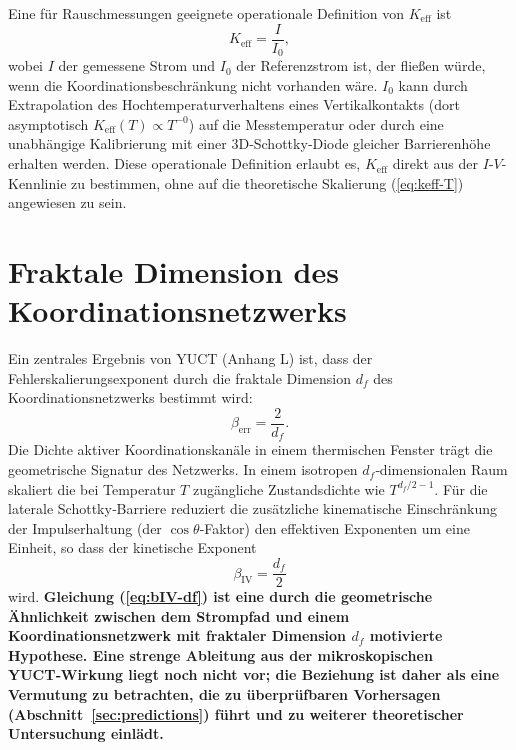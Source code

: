 \documentclass[12pt,a4paper]{article}
\newcommand{\Keff}{K_{\mathrm{eff}}}
\begin{document}
	Eine für Rauschmessungen geeignete operationale Definition von $\Keff$ ist
	\begin{equation}
		\Keff = \frac{I}{I_0},
		\label{eq:keff-operational}
	\end{equation}
	wobei $I$ der gemessene Strom und $I_0$ der Referenzstrom ist, der fließen
	würde, wenn die Koordinationsbeschränkung nicht vorhanden wäre. $I_0$ kann
	durch Extrapolation des Hochtemperaturverhaltens eines Vertikalkontakts
	(dort asymptotisch $\Keff(T) \propto T^{-0}$) auf die Messtemperatur oder
	durch eine unabhängige Kalibrierung mit einer 3D‑Schottky‑Diode gleicher
	Barrierenhöhe erhalten werden. Diese operationale Definition erlaubt es,
	$\Keff$ direkt aus der $I$‑$V$-Kennlinie zu bestimmen, ohne auf die
	theoretische Skalierung (\ref{eq:keff-T}) angewiesen zu sein.
	
	\section{Fraktale Dimension des Koordinationsnetzwerks}
	
	Ein zentrales Ergebnis von YUCT (Anhang L) ist, dass der
	Fehlerskalierungsexponent durch die fraktale Dimension $d_f$ des
	Koordinationsnetzwerks bestimmt wird:
	\begin{equation}
		\beta_{\mathrm{err}} = \frac{2}{d_f}.
		\label{eq:beta-df}
	\end{equation}
	Die Dichte aktiver Koordinationskanäle in einem thermischen Fenster trägt
	die geometrische Signatur des Netzwerks. In einem isotropen $d_f$‑dimensionalen
	Raum skaliert die bei Temperatur $T$ zugängliche Zustandsdichte wie
	$T^{d_f/2 - 1}$. Für die laterale Schottky‑Barriere reduziert die zusätzliche
	kinematische Einschränkung der Impulserhaltung (der $\cos\theta$‑Faktor) den
	effektiven Exponenten um eine Einheit, so dass der kinetische Exponent
	\begin{equation}
		\beta_{\mathrm{IV}} = \frac{d_f}{2}
		\label{eq:bIV-df}
	\end{equation}
	wird. \textbf{Gleichung (\ref{eq:bIV-df}) ist eine durch die geometrische
		Ähnlichkeit zwischen dem Strompfad und einem Koordinationsnetzwerk mit
		fraktaler Dimension $d_f$ motivierte Hypothese. Eine strenge Ableitung aus
		der mikroskopischen YUCT‑Wirkung liegt noch nicht vor; die Beziehung ist
		daher als eine Vermutung zu betrachten, die zu überprüfbaren Vorhersagen
		(Abschnitt~\ref{sec:predictions}) führt und zu weiterer theoretischer
		Untersuchung einlädt.}
	
\end{document}
